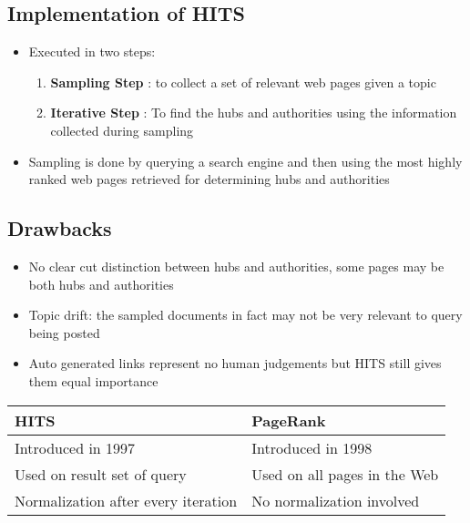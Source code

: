 \documentclass{article}
\begin{document}
\subsection{Implementation of HITS}
\begin{itemize}
    \item Executed in two steps:
    \begin{enumerate}
        \item \textbf{Sampling Step} : to collect a set of relevant web pages given a topic
        \item \textbf{Iterative Step} : To find the hubs and authorities using the information collected during sampling
    \end{enumerate}
        
    \item Sampling is done by querying a search engine and then using the most highly ranked web pages retrieved for determining hubs and authorities
\end{itemize}

\subsection{Drawbacks}
\begin{itemize}
    \item No clear cut distinction between hubs and authorities, some pages may be both hubs and authorities
    
    \item Topic drift: the sampled documents in fact may not be very relevant to query being posted
    
    \item Auto generated links represent no human judgements but HITS still gives them equal importance
\end{itemize}

\begin{tabular}{|p{} | p{} |}
    \hline
    \textbf{HITS} & \textbf{PageRank}  \\
    \hline
    Introduced in 1997 & Introduced in 1998 \\
    \hline
    Used on result set of query & Used on all pages in the Web \\
    \hline
    Normalization after every iteration & No normalization involved \\
    \hline 
\end{tabular}
\end{document}

